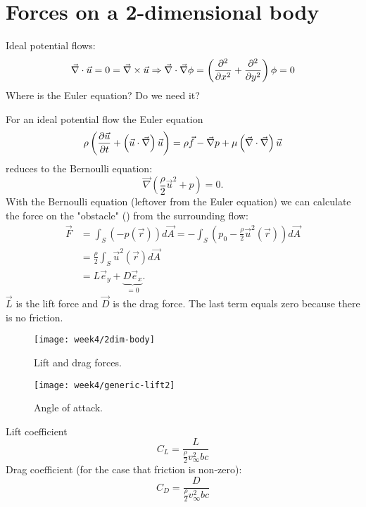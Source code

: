 \section{Forces on a 2-dimensional body}
\begin{framed}
Ideal potential flows:
\begin{equation}
\vec{\nabla}\cdot\vec{u}=0=\vec{\nabla}\times\vec{u}\Rightarrow\vec{\nabla}\cdot\vec{\nabla}\phi = \left(\frac{\partial^2 }{\partial x^2}+\frac{\partial^2 }{\partial y^2}\right)\phi=0
\end{equation}
Where is the Euler equation? Do we need it?
\end{framed}
For an ideal potential flow the Euler equation
\begin{equation}
\rho \left(\frac{\partial \vec{u}}{\partial t}+\left(\vec{u}\cdot\vec{\nabla}\right)\vec{u}\right) = \rho \vec{f} - \vec{\nabla}p + \mu\left(\vec{\nabla}\cdot\vec{\nabla}\right)\vec{u}
\end{equation}
reduces to the Bernoulli equation:
\begin{equation}
\vec{\nabla}\left(\frac{\rho}{2}\vec{u}^2+p\right)=0.
\end{equation}
With the Bernoulli equation (leftover from the Euler equation) we can calculate the force on the "obstacle" () from the surrounding flow:
\begin{align}
\vec{F} &= \int_{S}(-p(\vec{r}))d\vec{A} = -\int_{S}\left(p_0-\frac{\rho}{2}\vec{u}^2(\vec{r})\right)d\vec{A} \\
&= \frac{\rho}{2}\int_{S}\vec{u}^2(\vec{r})d\vec{A}\\
&= L\vec{e}_y +\underbrace{D\vec{e}_x}_{=0}.
\end{align}
$\vec{L}$ is the lift force and $\vec{D}$ is the drag force. The last term equals zero because there is no friction.

\begin{figure}[!h]
    \centering
    \texttt{[image: week4/2dim-body]}\\
    \caption{Lift and drag forces.}
    \label{fig:2dim-body}
\end{figure}

\begin{figure}[!h]
    \centering
    \texttt{[image: week4/generic-lift2]}\\
    \caption{Angle of attack.}
    \label{fig:generic-lift2}
\end{figure}

Lift coefficient
\begin{equation}
C_L = \frac{L}{\frac{\rho}{2}v_\infty^2 b c}
\end{equation}
Drag coefficient (for the case that friction is non-zero):
\begin{equation}
C_D = \frac{D}{\frac{\rho}{2}v_\infty^2 b c}
\end{equation}


